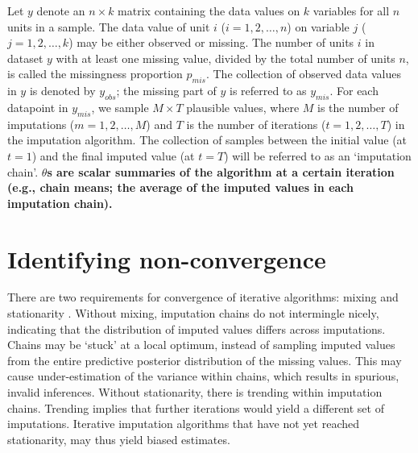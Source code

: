 \documentclass[Royal,times,sageh]{sagej}
\begin{document}
Let \(y\) denote an \(n \times k\) matrix containing the data values on
\(k\) variables for all \(n\) units in a sample. The data value of unit
\(i\) (\(i = 1, 2, \dots, n\)) on variable \(j\)
(\(j = 1, 2, \dots, k\)) may be either observed or missing. The number
of units \(i\) in dataset \(y\) with at least one missing value, divided
by the total number of units \(n\), is called the missingness proportion
\(p_{mis}\). The collection of observed data values in \(y\) is denoted
by \(y_{obs}\); the missing part of \(y\) is referred to as \(y_{mis}\).
For each datapoint in \(y_{mis}\), we sample \(M \times T\) plausible
values, where \(M\) is the number of imputations
(\(m = 1, 2, \dots, M\)) and \(T\) is the number of iterations
(\(t = 1, 2, \dots, T\)) in the imputation algorithm. The collection of
samples between the initial value (at \(t=1\)) and the final imputed
value (at \(t=T\)) will be referred to as an `imputation chain'.
\textbf{\(\theta\)s are scalar summaries of the algorithm at a certain
iteration (e.g., chain means; the average of the imputed values in each
imputation chain). }

\hypertarget{identifying-non-convergence}{%
\section{Identifying
non-convergence}\label{identifying-non-convergence}}

There are two requirements for convergence of iterative algorithms:
mixing and stationarity \citep{gelm13}. Without mixing, imputation
chains do not intermingle nicely, indicating that the distribution of
imputed values differs across imputations. Chains may be `stuck' at a
local optimum, instead of sampling imputed values from the entire
predictive posterior distribution of the missing values. This may cause
under-estimation of the variance within chains, which results in
spurious, invalid inferences. Without stationarity, there is trending
within imputation chains. Trending implies that further iterations would
yield a different set of imputations. Iterative imputation algorithms
that have not yet reached stationarity, may thus yield biased estimates.
\end{document}
